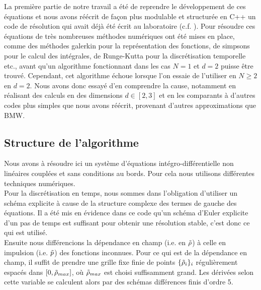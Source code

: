 \documentclass[10pt]{article}
\begin{document}
\begin{multicols}{2}
La première partie de notre travail a été de reprendre le développement de ces équations et nous avons réécrit de façon plus modulable et structurée en C++ un code de résolution qui avait déjà été écrit au laboratoire (c.f. ). Pour résoudre ces équations de très nombreuses méthodes numériques ont été mises en place, comme des méthodes galerkin \cite{shen1994efficient, LeonardThesis} pour la représentation des fonctions, de simpsons pour le calcul des intégrales, de Runge-Kutta pour la discrétisation temporelle etc., avant qu'un algorithme fonctionnant dans les cas $N=1$ et $d=2$ puisse être trouvé. Cependant, cet algorithme échoue lorsque l'on essaie de l'utiliser en $N \ge 2$ en $d=2$. Nous avons donc essayé d'en comprendre la cause, notamment en réalisant des calculs en des dimensions $d \in [2,3]$ et en les comparants à d'autres codes plus simples que nous avons réécrit, provenant d'autres approximations que BMW. 




\subsection{Structure de l'algorithme}

Nous avons à résoudre ici un système d'équations intégro-différentielle non linéaires couplées et sans conditions au bords. Pour cela nous utilisons différentes techniques numériques. \\

Pour la discrétisation en temps, nous sommes dans l'obligation d'utiliser un schéma explicite à cause de la structure complexe des termes de gauche des équations. Il a été mis en évidence dans ce code qu'un schéma d'Euler explicite d'un pas de temps est suffisant pour obtenir une résolution stable, c'est donc ce qui est utilisé. \\

Ensuite nous différencions la dépendance en champ (i.e. en $\tilde{\rho}$) à celle en impulsion (i.e. $\tilde{p}$) des fonctions inconnues. Pour ce qui est de la dépendance en champ, il suffit de prendre une grille fixe finie de points $\{ \tilde{\rho}_i \}_i$ régulièrement espacés dans $[0, \tilde{\rho}_{max}]$, où $\tilde{\rho}_{max}$ est choisi suffisamment grand. Les dérivées selon cette variable se calculent alors par des schémas différences finis d'ordre 5. \\


\end{multicols}
\end{document}
